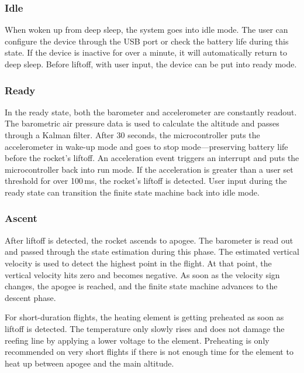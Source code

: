 \subsubsection{Idle}
When woken up from deep sleep, the system goes into idle mode. The user can configure the device through the USB port or check the battery life during this state. If the device is inactive for over a minute, it will automatically return to deep sleep. Before liftoff, with user input, the device can be put into ready mode.

\subsubsection{Ready}
In the ready state, both the barometer and accelerometer are constantly readout. The barometric air pressure data is used to calculate the altitude and passes through a Kalman filter. After 30 seconds, the microcontroller puts the accelerometer in wake-up mode and goes to stop mode—preserving battery life before the rocket's liftoff. An acceleration event triggers an interrupt and puts the microcontroller back into run mode. If the acceleration is greater than a user set threshold for over 100\,ms, the rocket's liftoff is detected. User input during the ready state can transition the finite state machine back into idle mode. 

\subsubsection{Ascent}
After liftoff is detected, the rocket ascends to apogee. The barometer is read out and passed through the state estimation during this phase. The estimated vertical velocity is used to detect the highest point in the flight. At that point, the vertical velocity hits zero and becomes negative. As soon as the velocity sign changes, the apogee is reached, and the finite state machine advances to the descent phase.

For short-duration flights, the heating element is getting preheated as soon as liftoff is detected. The temperature only slowly rises and does not damage the reefing line by applying a lower voltage to the element. Preheating is only recommended on very short flights if there is not enough time for the element to heat up between apogee and the main altitude. 

